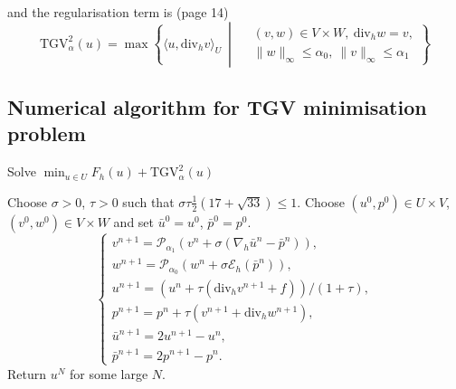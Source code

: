 \documentclass{article}
\begin{document}
and
the regularisation term is (page 14)
\begin{equation}
    \mathrm{TGV}^2_\alpha(u) = \max \left\{ \langle u, \mathrm{div}_h v \rangle_U \ \middle| \ 
    \begin{aligned}
    &(v, w) \in V \times W, \ \mathrm{div}_h w = v, \\
    &\|w\|_\infty \leq \alpha_0, \ \|v\|_\infty \leq \alpha_1 
    \end{aligned}
    \right\}
\end{equation}



\subsection{
Numerical
algorithm for TGV minimisation problem
}


\begin{algorithm}[H]
    \caption{Solve $\min_{u \in U} F_h(u) + \mathrm{TGV}^2_{\alpha}(u)$}
    \begin{algorithmic}[1]
    \State Choose $\sigma > 0$, $\tau > 0$ such that $\sigma \tau \frac{1}{2} (17 + \sqrt{33}) \leq 1$.
    \State Choose $(u^0, p^0) \in U \times V$, $(v^0, w^0) \in V \times W$ and set $\bar{u}^0 = u^0$, $\bar{p}^0 = p^0$.
    \For {$n = 0, 1, 2, \ldots$}
        \State \begin{equation*}
        \begin{cases}
        v^{n+1} = \mathcal{P}_{\alpha_1} \left( v^n + \sigma (\nabla_h \bar{u}^n - \bar{p}^n) \right), \\
        w^{n+1} = \mathcal{P}_{\alpha_0} \left( w^n + \sigma \mathcal{E}_h (\bar{p}^n) \right), \\
        u^{n+1} = \left( u^n + \tau (\text{div}_h v^{n+1} + f) \right) / ( 1 + \tau ), \\
        p^{n+1} = p^n + \tau (v^{n+1} + \text{div}_h w^{n+1}), \\
        \bar{u}^{n+1} = 2u^{n+1} - u^n, \\
        \bar{p}^{n+1} = 2p^{n+1} - p^n.
        \end{cases}
        \end{equation*}
    \EndFor
    \State Return $u^N$ for some large $N$.
    \end{algorithmic}
    \label{alg:pdhg}
\end{algorithm}
\end{document}
